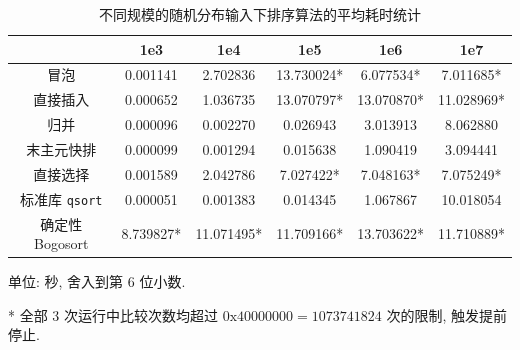 \documentclass[12pt]{article}
\begin{document}
\begin{table}
\centering
\begin{threeparttable}
    \caption{不同规模的随机分布输入下排序算法的平均耗时统计}
    \begin{tabular}{cccccc}
        \toprule
         & 1e3 & 1e4 & 1e5 & 1e6 & 1e7 \\
        \midrule
        冒泡 & 0.001141 & 2.702836 & 13.730024* & 6.077534* & 7.011685* \\
        直接插入 & 0.000652 & 1.036735 & 13.070797* & 13.070870* & 11.028969* \\
        归并 & 0.000096 & 0.002270 & 0.026943 & 3.013913 & 8.062880 \\
        末主元快排 & 0.000099 & 0.001294 & 0.015638 & 1.090419 & 3.094441 \\
        直接选择 & 0.001589 & 2.042786 & 7.027422* & 7.048163* & 7.075249* \\
        标准库 \texttt{qsort} & 0.000051 & 0.001383 & 0.014345 & 1.067867 & 10.018054 \\
        确定性 Bogosort & 8.739827* & 11.071495* & 11.709166* & 13.703622* & 11.710889* \\
        \bottomrule
    \end{tabular}
    \begin{tablenotes}
        \small
        \item 单位: 秒, 舍入到第 6 位小数.
        \item[*] 全部 3 次运行中比较次数均超过 $0\mathrm{x}40000000 = 1073741824$ 次的限制, 触发提前停止.
    \end{tablenotes}
    \label{table_result_random}
\end{threeparttable}
\end{table}
\end{document}
